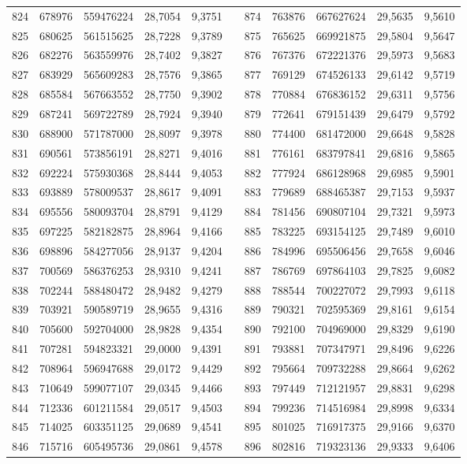 \begin{longtable}{rrrrrrrrrrr}
824&678976&559476224&28,7054&9,3751&&874&763876&667627624&29,5635&9,5610\\
825&680625&561515625&28,7228&9,3789&&875&765625&669921875&29,5804&9,5647\\
826&682276&563559976&28,7402&9,3827&&876&767376&672221376&29,5973&9,5683\\
827&683929&565609283&28,7576&9,3865&&877&769129&674526133&29,6142&9,5719\\
828&685584&567663552&28,7750&9,3902&&878&770884&676836152&29,6311&9,5756\\
829&687241&569722789&28,7924&9,3940&&879&772641&679151439&29,6479&9,5792\\
830&688900&571787000&28,8097&9,3978&&880&774400&681472000&29,6648&9,5828\\
831&690561&573856191&28,8271&9,4016&&881&776161&683797841&29,6816&9,5865\\
832&692224&575930368&28,8444&9,4053&&882&777924&686128968&29,6985&9,5901\\
833&693889&578009537&28,8617&9,4091&&883&779689&688465387&29,7153&9,5937\\
834&695556&580093704&28,8791&9,4129&&884&781456&690807104&29,7321&9,5973\\
835&697225&582182875&28,8964&9,4166&&885&783225&693154125&29,7489&9,6010\\
836&698896&584277056&28,9137&9,4204&&886&784996&695506456&29,7658&9,6046\\
837&700569&586376253&28,9310&9,4241&&887&786769&697864103&29,7825&9,6082\\
838&702244&588480472&28,9482&9,4279&&888&788544&700227072&29,7993&9,6118\\
839&703921&590589719&28,9655&9,4316&&889&790321&702595369&29,8161&9,6154\\
840&705600&592704000&28,9828&9,4354&&890&792100&704969000&29,8329&9,6190\\
841&707281&594823321&29,0000&9,4391&&891&793881&707347971&29,8496&9,6226\\
842&708964&596947688&29,0172&9,4429&&892&795664&709732288&29,8664&9,6262\\
843&710649&599077107&29,0345&9,4466&&893&797449&712121957&29,8831&9,6298\\
844&712336&601211584&29,0517&9,4503&&894&799236&714516984&29,8998&9,6334\\
845&714025&603351125&29,0689&9,4541&&895&801025&716917375&29,9166&9,6370\\
846&715716&605495736&29,0861&9,4578&&896&802816&719323136&29,9333&9,6406\\

\end{longtable}
